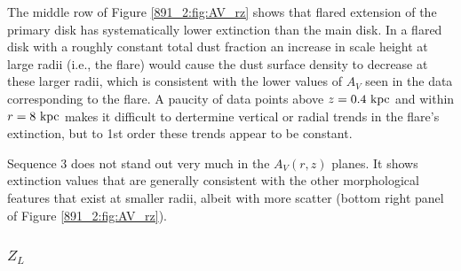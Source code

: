 The middle row of Figure \ref{891_2:fig:AV_rz} shows that flared extension
of the primary disk has systematically lower extinction than the main
disk. In a flared disk with a roughly constant total dust fraction an
increase in scale height at large radii (i.e., the flare) would cause
the dust surface density to decrease at these larger radii, which is
consistent with the lower values of $A_V$ seen in the data
corresponding to the flare. A paucity of data points above $z =
0.4~\mathrm{kpc} $ and within $r = 8~\mathrm{kpc} $ makes it difficult to
dertermine vertical or radial trends in the flare's extinction, but to
1st order these trends appear to be constant.


Sequence 3 does not stand out very much in the $A_V(r,z)$ planes. It
shows extinction values that are generally consistent with the other
morphological features that exist at smaller radii, albeit with more
scatter (bottom right panel of Figure \ref{891_2:fig:AV_rz}).


\subsubsection{$Z_L$}

